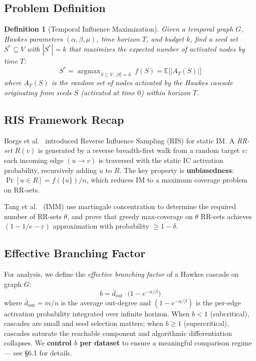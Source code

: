 \documentclass[10pt,conference]{IEEEtran}
\newtheorem{definition}{Definition}
\begin{document}
\subsection{Problem Definition}

\begin{definition}[Temporal Influence Maximization]
Given a temporal graph $G$, Hawkes parameters $(\alpha, \beta, \mu)$, time horizon $T$, and budget $k$, find a seed set $S^* \subseteq V$ with $|S^*| = k$ that maximizes the expected number of activated nodes by time $T$:
\begin{equation}
S^* = \operatorname{argmax}_{S \subseteq V,\ |S| = k}\ f(S) = \mathbb{E}\big[|A_T(S)|\big]
\label{eq:tim_objective}
\end{equation}
where $A_T(S)$ is the random set of nodes activated by the Hawkes cascade originating from seeds $S$ (activated at time $0$) within horizon $T$.
\end{definition}

\subsection{RIS Framework Recap}

Borgs et al.~\cite{borgs2014} introduced Reverse Influence Sampling (RIS) for static IM.
A \emph{RR-set} $R(v)$ is generated by a reverse breadth-first walk from a random target $v$: each incoming edge $(u \rightarrow v)$ is traversed with the static IC activation probability, recursively adding $u$ to $R$.
The key property is \textbf{unbiasedness}: $\Pr[u \in R] = f(\{u\}) / n$, which reduces IM to a maximum coverage problem on RR-sets.

Tang et al.~\cite{tang2015} (IMM) use martingale concentration to determine the required number of RR-sets $\theta$, and prove that greedy max-coverage on $\theta$ RR-sets achieves $(1-1/e-\varepsilon)$ approximation with probability $\ge 1-\delta$.

\subsection{Effective Branching Factor}

For analysis, we define the \emph{effective branching factor} of a Hawkes cascade on graph $G$:
\begin{equation}
b = \bar{d}_{\text{out}} \cdot \big(1 - e^{-\alpha/\beta}\big)
\label{eq:branching}
\end{equation}
where $\bar{d}_{\text{out}} = m/n$ is the average out-degree and $(1-e^{-\alpha/\beta})$ is the per-edge activation probability integrated over infinite horizon.
When $b < 1$ (subcritical), cascades are small and seed selection matters; when $b \ge 1$ (supercritical), cascades saturate the reachable component and algorithmic differentiation collapses.
We \textbf{control $b$ per dataset} to ensure a meaningful comparison regime — see \S6.1 for details.
\end{document}
